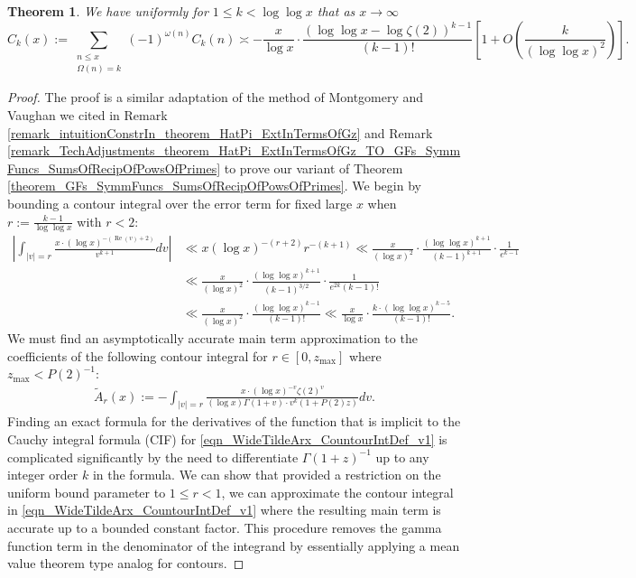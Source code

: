 \documentclass[11pt,reqno,a4letter]{article}
\numberwithin{figure}{section}
\numberwithin{table}{section}
\theoremstyle{plain}
\newtheorem{theorem}{Theorem}
\numberwithin{theorem}{section}
\theoremstyle{definition}
\renewcommand{\Re}{\operatorname{Re}}
\begin{document}
\begin{theorem} 
\label{theorem_CnkSpCasesScaledSummatoryFuncs} 
We have uniformly for $1 \leq k < \log\log x$ 
that as $x \rightarrow \infty$ 
\[
\widehat{C}_k(x) := 
     \sum_{\substack{n \leq x \\ \Omega(n) = k}} (-1)^{\omega(n)} 
     C_k(n) \asymp 
     -\frac{x}{\log x} \cdot \frac{(\log\log x - \log\zeta(2))^{k-1}}{(k-1)!} \left[1 + 
     O\left(\frac{k}{(\log\log x)^2}\right)\right]. 
\]
\end{theorem} 
\begin{proof} 
The proof is a similar adaptation of the method of Montgomery and Vaughan we cited in 
Remark \ref{remark_intuitionConstrIn_theorem_HatPi_ExtInTermsOfGz} and 
Remark \ref{remark_TechAdjustments_theorem_HatPi_ExtInTermsOfGz_TO_GFs_SymmFuncs_SumsOfRecipOfPowsOfPrimes} 
to prove our variant of 
Theorem \ref{theorem_GFs_SymmFuncs_SumsOfRecipOfPowsOfPrimes}. 
We begin by bounding a contour integral over the error term for fixed large $x$ when 
$r := \frac{k-1}{\log\log x}$ with $r < 2$: 
\begin{align*} 
\left\lvert \int_{|v|=r} \frac{x \cdot (\log x)^{-(\Re(v) + 2)}}{v^{k+1}} dv \right\rvert & \ll 
     x (\log x)^{-(r+2)} r^{-(k+1)} \ll \frac{x}{(\log x)^2} \cdot 
     \frac{(\log\log x)^{k+1}}{(k-1)^{k+1}} \cdot \frac{1}{e^{k-1}} \\ 
     & \ll \frac{x}{(\log x)^2} \cdot \frac{(\log\log x)^{k+1}}{(k-1)^{3/2}} \cdot 
     \frac{1}{e^{2k} (k-1)!} \\ 
     & \ll \frac{x}{(\log x)^2} \cdot \frac{(\log\log x)^{k-1}}{(k-1)!} \ll 
     \frac{x}{\log x} \cdot \frac{k \cdot (\log\log x)^{k-5}}{(k-1)!}. 
\end{align*} 
We must find an asymptotically accurate main term approximation to the coefficients 
of the following contour integral for $r \in [0, z_{\max}]$ where $z_{\max} < P(2)^{-1}$: 
\begin{align} 
\label{eqn_WideTildeArx_CountourIntDef_v1} 
\widetilde{A}_r(x) := 
     -\int_{|v|=r} \frac{x \cdot (\log x)^{-v} \zeta(2)^{v}}{(\log x) \Gamma(1+v) \cdot 
     v^{k} (1 + P(2) z)} dv. 
\end{align} 
Finding an exact formula for the derivatives of the function that is implicit to the 
Cauchy integral formula (CIF) for \eqref{eqn_WideTildeArx_CountourIntDef_v1} 
is complicated significantly by the need to differentiate $\Gamma(1+z)^{-1}$ 
up to any integer order $k$ in the formula. 
We can show that provided a restriction on the uniform bound parameter to 
$1 \leq r < 1$, we can approximate the contour integral in 
\eqref{eqn_WideTildeArx_CountourIntDef_v1} where 
the resulting main term is accurate up to a bounded constant factor. 
This procedure removes the 
gamma function term in the denominator of the integrand by essentially applying 
a mean value theorem type analog for contours. 


\end{proof}
\end{document}
